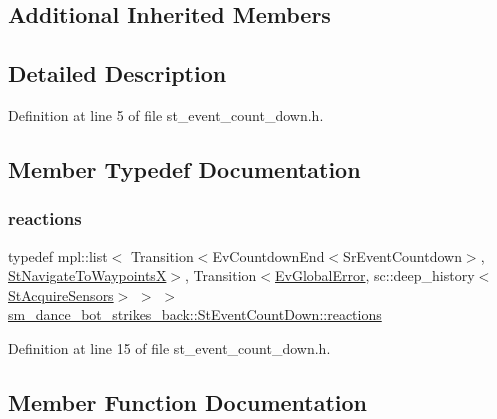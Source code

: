 \subsection*{Additional Inherited Members}


\subsection{Detailed Description}


Definition at line 5 of file st\+\_\+event\+\_\+count\+\_\+down.\+h.



\subsection{Member Typedef Documentation}
\mbox{\label{structsm__dance__bot__strikes__back_1_1StEventCountDown_a727d864e6d375449a51fd8ea47810551}} 
\subsubsection{\texorpdfstring{reactions}{reactions}}
{\footnotesize\ttfamily typedef mpl\+::list$<$ Transition$<$Ev\+Countdown\+End$<$Sr\+Event\+Countdown$>$, \hyperlink{structsm__dance__bot__strikes__back_1_1StNavigateToWaypointsX}{St\+Navigate\+To\+WaypointsX}$>$, Transition$<$\hyperlink{structsm__dance__bot__strikes__back_1_1EvGlobalError}{Ev\+Global\+Error}, sc\+::deep\+\_\+history$<$\hyperlink{structsm__dance__bot__strikes__back_1_1StAcquireSensors}{St\+Acquire\+Sensors}$>$ $>$ $>$ \hyperlink{structsm__dance__bot__strikes__back_1_1StEventCountDown_a727d864e6d375449a51fd8ea47810551}{sm\+\_\+dance\+\_\+bot\+\_\+strikes\+\_\+back\+::\+St\+Event\+Count\+Down\+::reactions}}



Definition at line 15 of file st\+\_\+event\+\_\+count\+\_\+down.\+h.



\subsection{Member Function Documentation}
\mbox{\label{structsm__dance__bot__strikes__back_1_1StEventCountDown_a2b0d518bcc72065392d547d69c0dff7d}} 
